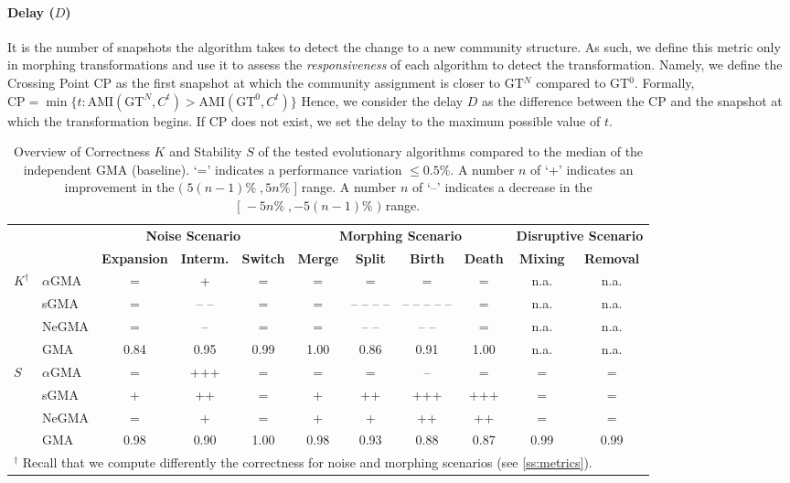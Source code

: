 \documentclass[letterpaper]{article}
\begin{document}
\paragraph*{Delay ($D$)} It is the number of snapshots the algorithm takes to detect the change to a new community structure. As such, we define this metric only in morphing transformations and use it to assess the \emph{responsiveness} of each algorithm to detect the transformation. Namely, we define the Crossing Point CP as the first snapshot at which the community assignment is closer to GT$^N$ compared to GT$^0$. Formally, $\text{CP}=\min\{t:\text{AMI}(\text{GT}^N,C^t)>\text{AMI}(\text{GT}^0,C^t)\}$ Hence, we consider the delay $D$ as the difference between the CP and the snapshot at which the transformation begins. If CP does not exist, we set the delay to the maximum possible value of $t$.

\begin{table}[]
\centering
\footnotesize
\caption{Overview of Correctness $K$ and Stability $S$ of the tested evolutionary algorithms compared to the median of the independent GMA (baseline). `=' indicates a performance
variation $\leq 0.5\%$. A number $n$ of `+' indicates an improvement in the $(\;5(n-1)\%\;,5n\%\;]$ range. A number $n$ of `--' indicates a decrease in the $[\;-5 n\%\;,-5(n-1)\%\;)$ range.}
\label{tab:main_results}
\begin{tabular}{ll|ccc|cccc|cc}
\toprule
& & \multicolumn{3}{c|}{\textbf{Noise Scenario}} & \multicolumn{4}{c|}{\textbf{Morphing Scenario}} & \multicolumn{2}{c}{\textbf{Disruptive Scenario}} \\
&\textbf{} & \textbf{Expansion} & \textbf{Interm.} & \textbf{Switch} & \textbf{Merge} & \textbf{Split} & \textbf{Birth} & \textbf{Death} & \textbf{Mixing} & \textbf{Removal} \\
\midrule
\multirow{4}{*}{$K ^\dagger$} &
$\alpha$GMA  & = & + & =   & = & =     & =     & =   & n.a. & n.a. \\
& sGMA       & = & -- -- & =    & = & -- -- -- -- & -- -- -- -- -- & =   & n.a. & n.a. \\
& NeGMA      & = & -- & =    & = & -- --     & -- --    & =   & n.a. & n.a. \\
\cmidrule{2-11}
& GMA      & 0.84 & 0.95 &  0.99 & 1.00 & 0.86 & 0.91 & 1.00  & n.a. & n.a. \\
\midrule
\multirow{4}{*}{$S$} & 
$\alpha$GMA  & = & +++ & =  &= & =     & --   & =    & = & = \\
& sGMA       & + & ++ & =   &+ & ++    & +++ & +++  & = & = \\
& NeGMA      & = & + & =    &+ & +    & ++  & ++   & = & = \\
\cmidrule{2-11}
& GMA      & 0.98 & 0.90 &  1.00 & 0.98 & 0.93 &  0.88 & 0.87 & 0.99 & 0.99 \\
\bottomrule
\multicolumn{11}{l}{$^\dagger$ Recall that we compute differently the correctness for noise and morphing scenarios (see \cref{ss:metrics}).} \\
\end{tabular}
\end{table}
\end{document}
